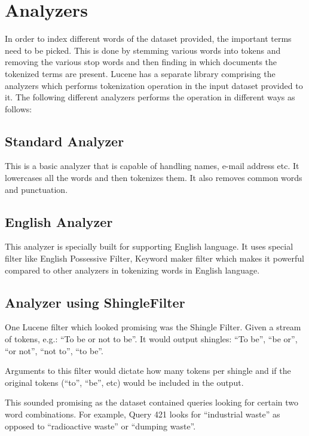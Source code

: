 \section{Analyzers}

In order to index different words of the dataset provided, the important terms need to be picked. This is done by stemming various words into tokens and removing the various stop words and then finding in which documents the tokenized terms are present. Lucene has a separate library comprising the analyzers which performs tokenization operation in the input dataset provided to it. The following different analyzers performs the operation in different ways as follows:

\subsection{Standard Analyzer}

This is a basic analyzer that is capable of handling names, e-mail address etc. It lowercases all the words and then tokenizes them. It also removes common words and punctuation.

\subsection{English Analyzer}

This analyzer is specially built for supporting English language. It uses special filter like English Possessive Filter, Keyword maker filter which makes it powerful compared to other analyzers in tokenizing words in English language.

\subsection{Analyzer using ShingleFilter}

One Lucene filter which looked promising was the Shingle Filter. Given a stream of tokens, e.g.: “To be or not to be”. It would output shingles: “To be”, “be or”, “or not”, “not to”, “to be”.

Arguments to this filter would dictate how many tokens per shingle and if the original tokens (“to”, “be”, etc) would be included in the output.

This sounded promising as the dataset contained queries looking for certain two word combinations. For example, Query 421 looks for “industrial waste” as opposed to “radioactive waste” or “dumping waste”.

